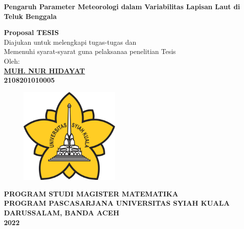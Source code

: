 \begin{spacing}{1}
	\begin{center}
		{\Large\textbf{Pengaruh Parameter Meteorologi dalam Variabilitas Lapisan Laut di Teluk Benggala}}\\[1.0cm]
	\end{center}
	\vspace*{0.8cm} 
	
	\begin{center}
		
		\large{\textbf{Proposal TESIS}}
		\\\vspace*{1.8cm}    
		\normalsize{Diajukan untuk melengkapi tugas-tugas dan \\
			Memenuhi syarat-syarat guna pelaksanaa penelitian Tesis}\\[1.5cm]
		\vspace*{1cm}  
		{\large Oleh:}\\
		\vspace*{1cm}       
		\large{\textbf{\underline{MUH. NUR HIDAYAT}}}
		\\\large{\textbf{2108201010005}} 
	\end{center}\vspace*{1cm}   
	
	\begin{figure}[h]
		\centering
		\includegraphics[width=5cm]{contents/USK} %
	\end{figure}
	\vspace*{1.5cm}   
	
	\begin{center}
		\textbf{PROGRAM STUDI MAGISTER MATEMATIKA \\
			PROGRAM PASCASARJANA UNIVERSITAS SYIAH KUALA\\
			DARUSSALAM, BANDA ACEH\\
			2022}
	\end{center}
	\thispagestyle{empty}
\end{spacing}